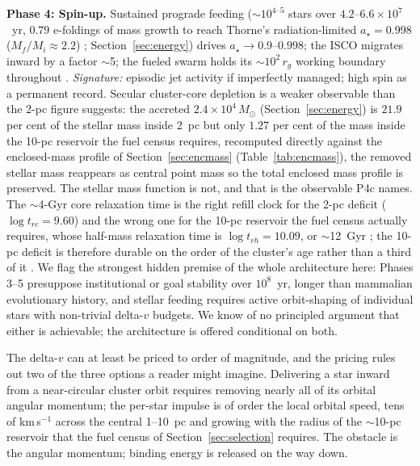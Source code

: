\documentclass[11pt]{article}
\newcommand{\msun}{\ensuremath{M_\odot}}
\newcommand{\astar}{\ensuremath{a_\star}}
\begin{document}
\textbf{Phase 4: Spin-up.} Sustained prograde feeding ($\sim$$10^{4\text{--}5}$ stars over $4.2$--$6.6\times10^{7}$~yr, $0.79$ e-foldings of mass growth to reach Thorne's radiation-limited $\astar = 0.998$ ($M_{f}/M_{i} \approx 2.2$) \citep{Bardeen1970,Thorne1974,Swanson2026Engineered}; Section~\ref{sec:energy}) drives $\astar \to 0.9$--$0.998$; the ISCO migrates inward by a factor $\sim$5; the fueled swarm holds its $\sim$$10^{2}\,r_g$ working boundary throughout \citep{Swanson2026Engineered}. \emph{Signature:} episodic jet activity if imperfectly managed; high spin as a permanent record. Secular cluster-core depletion is a weaker observable than the 2-pc figure suggests: the accreted $2.4\times10^{4}\,\msun$ (Section~\ref{sec:energy}) is $21.9$ per cent of the stellar mass inside 2~pc but only $1.27$ per cent of the mass inside the 10-pc reservoir the fuel census requires, recomputed directly against the enclosed-mass profile of Section~\ref{sec:encmass} (Table~\ref{tab:encmass}), the removed stellar mass reappears as central point mass so the total enclosed mass profile is preserved. The stellar mass function is not, and that is the observable P4c names. The $\sim$4-Gyr core relaxation time is the right refill clock for the 2-pc deficit ($\log t_{rc} = 9.60$) and the wrong one for the 10-pc reservoir the fuel census actually requires, whose half-mass relaxation time is $\log t_{rh} = 10.09$, or $\sim$12~Gyr \citep{Harris1996}; the 10-pc deficit is therefore durable on the order of the cluster's age rather than a third of it \citep[][; Appendix~\ref{sec:revrecord}]{Swanson2026Engineered}. We flag the strongest hidden premise of the whole architecture here: Phases 3--5 presuppose institutional or goal stability over $10^{8}$~yr, longer than mammalian evolutionary history, and stellar feeding requires active orbit-shaping of individual stars with non-trivial delta-$v$ budgets. We know of no principled argument that either is achievable; the architecture is offered conditional on both.

The delta-$v$ can at least be priced to order of magnitude, and the pricing rules out two of the three options a reader might imagine. Delivering a star inward from a near-circular cluster orbit requires removing nearly all of its orbital angular momentum; the per-star impulse is of order the local orbital speed, tens of km\,s$^{-1}$ across the central 1--10~pc and growing with the radius of the $\sim$10-pc reservoir that the fuel census of Section~\ref{sec:selection} requires. The obstacle is the angular momentum; binding energy is released on the way down.
\end{document}
